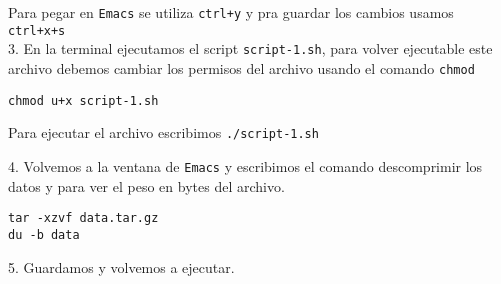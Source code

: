 \documentclass[12pt]{article}
\begin{document}
Para pegar en \verb+Emacs+ se utiliza \verb|ctrl+y| y pra guardar los cambios usamos \verb"ctrl+x+s"\\

3. En la terminal ejecutamos el script \verb+script-1.sh+, para volver ejecutable este archivo debemos cambiar los permisos 
del archivo usando el comando \verb+chmod+ \\

\begin{verbatim}
chmod u+x script-1.sh
\end{verbatim}


Para ejecutar el archivo escribimos \verb|./script-1.sh|

4. Volvemos a la ventana de \verb+Emacs+ y escribimos el comando descomprimir los datos y para ver el peso en bytes del archivo.

\begin{verbatim}
tar -xzvf data.tar.gz
du -b data
\end{verbatim}

5. Guardamos y volvemos a ejecutar.
\end{document}
